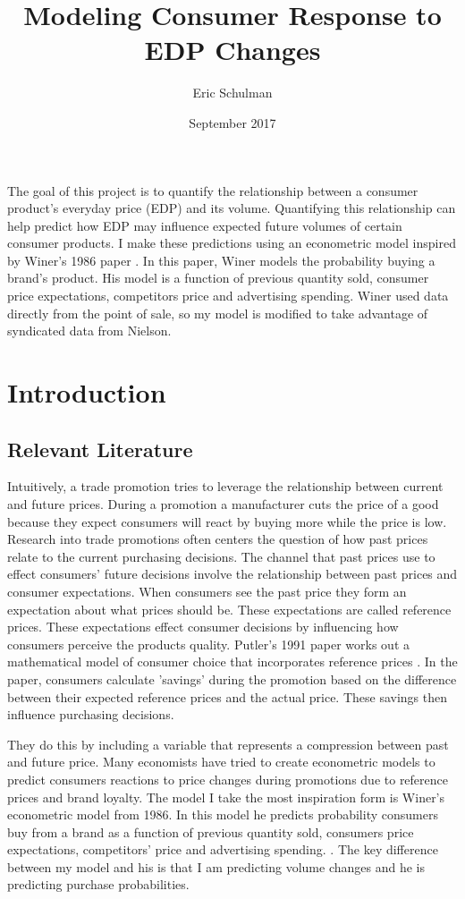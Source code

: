 \documentclass{article}
\title{Modeling Consumer Response to EDP Changes}
\author{Eric Schulman}
\date{September 2017}
\begin{document}
\maketitle

The goal of this project is to quantify the relationship between a consumer product's everyday price (EDP) and its volume. Quantifying this relationship can help predict how EDP may influence expected future volumes of certain consumer products. I make these predictions using an econometric model inspired by Winer's 1986 paper \cite{winer}. In this paper, Winer models the probability buying a brand's product. His model is a function of previous quantity sold, consumer price expectations, competitors price and advertising spending. Winer used data directly from the point of sale, so my model is modified to take advantage of syndicated data from Nielson.

\section{Introduction}

\subsection{Relevant Literature}

Intuitively, a trade promotion tries to leverage the relationship between current and future prices. During a promotion a manufacturer cuts the price of a good because they expect consumers will react by buying more while the price is low. Research into trade promotions often centers the question of how past prices relate to the current purchasing decisions. The channel that past prices use to effect consumers' future decisions involve the relationship between past prices and consumer expectations. When consumers see the past price they form an expectation about what prices should be. These expectations are called reference prices. These expectations effect consumer decisions by influencing how consumers perceive the products quality. Putler's 1991 paper works out a mathematical model of consumer choice that incorporates reference prices \cite{putler}. In the paper, consumers calculate 'savings' during the promotion based on the difference between their expected reference prices and the actual price. These savings then influence purchasing decisions.


They do this by including a variable that represents a compression between past and future price. Many economists have tried to create econometric models to predict consumers reactions to price changes during promotions due to reference prices and brand loyalty. The model I take the most inspiration form is Winer's econometric model from 1986. In this model he predicts probability consumers buy from a brand as a function of previous quantity sold, consumers price expectations, competitors' price and advertising spending.  \cite{winer}. The key difference between my model and his is that I am predicting volume changes and he is predicting purchase probabilities.
\end{document}
